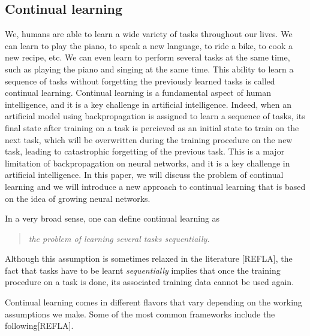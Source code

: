 \documentclass[twocolumn]{article}
\begin{document}
\subsection{Continual learning}


We, humans are able to learn a wide variety of tasks throughout our lives. We can learn to play the piano, to speak a new language, to ride a bike, to cook a new recipe, etc. We can even learn to perform several tasks at the same time, such as playing the piano and singing at the same time. This ability to learn a sequence of tasks without forgetting the previously learned tasks is called continual learning. Continual learning is a fundamental aspect of human intelligence, and it is a key challenge in artificial intelligence. Indeed, when an artificial model using backpropagation is assigned to learn a sequence of tasks, its final state after training on a task is percieved as an initial state to train on the next task, which will be overwritten during the training procedure on the new task, leading to catastrophic forgetting of the previous task. This is a major limitation of backpropagation on neural networks, and it is a key challenge in artificial intelligence. In this paper, we will discuss the problem of continual learning and we will introduce a new approach to continual learning that is based on the idea of growing neural networks.

\vspace{2mm}
\noindent
In a very broad sense, one can define continual learning as

\begin{quote}
    \itshape
    \centering
    the problem of learning several tasks sequentially.
\end{quote}
Although this assumption is sometimes relaxed in the literature [REFLA], the fact that tasks have to be learnt \textit{sequentially} implies that once the training procedure on a task is done, its associated training data cannot be used again. 

\vspace{2mm}
\noindent
Continual learning comes in different flavors that vary depending on the working assumptions we make. Some of the most common frameworks include the following[REFLA].
\end{document}
